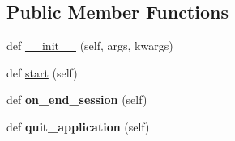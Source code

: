 \subsection*{Public Member Functions}
\begin{DoxyCompactItemize}
\item 
def \hyperlink{class_uni_dec_1_1_g_uni_dec_1_1_uni_dec_app_aa7bd8067de1c28acc13ab7ef9759c9f9}{\+\_\+\+\_\+init\+\_\+\+\_\+} (self, args, kwargs)
\item 
def \hyperlink{class_uni_dec_1_1_g_uni_dec_1_1_uni_dec_app_a0ce2e5977e8b5b313bf4492f8ba5ff07}{start} (self)
\item 
\hypertarget{class_uni_dec_1_1_g_uni_dec_1_1_uni_dec_app_a5a06d94c813c13489b21526d21b4d952}{}def {\bfseries on\+\_\+end\+\_\+session} (self)\label{class_uni_dec_1_1_g_uni_dec_1_1_uni_dec_app_a5a06d94c813c13489b21526d21b4d952}

\item 
\hypertarget{class_uni_dec_1_1_g_uni_dec_1_1_uni_dec_app_a56caa5f7e28b270b7f406f6eb60a60ae}{}def {\bfseries quit\+\_\+application} (self)\label{class_uni_dec_1_1_g_uni_dec_1_1_uni_dec_app_a56caa5f7e28b270b7f406f6eb60a60ae}


\end{DoxyCompactItemize}
